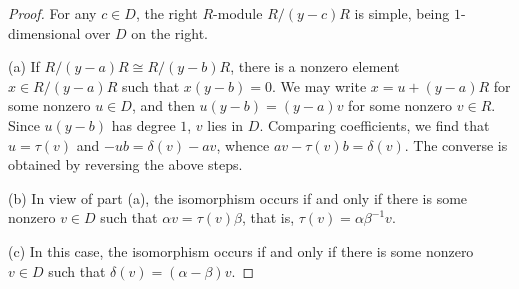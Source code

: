 \documentclass[10pt,a4paper]{amsart}
\begin{document}
\begin{proof}
For any $c\in D$, the right $R$-module $R/(y-c)R$ is simple, being $1$-di\-men\-sional over $D$ on the right.

(a) If $R/(y-a)R \cong R/(y-b)R$, there is a nonzero element $x \in R/(y-a)R$ such that $x(y-b) = 0$.  We may write $x = u+(y-a)R$ for some nonzero $u \in D$, and then $u(y-b) = (y-a)v$ for some nonzero $v \in R$.  Since $u(y-b)$ has degree $1$, $v$ lies in $D$.  Comparing coefficients, we find that $u = \tau(v)$ and $- ub = \delta(v) - av$, whence $av-\tau(v)b = \delta(v)$.  The converse is obtained by reversing the above steps.

(b) In view of part (a), the isomorphism occurs if and only if there is some nonzero $v \in D$ such that $\alpha v = \tau(v) \beta$, that is, $\tau(v) = \alpha \beta^{-1} v$.

(c) In this case, the isomorphism occurs if and only if there is some nonzero $v \in D$ such that $\delta(v) = (\alpha-\beta)v$.
\end{proof}
\end{document}
